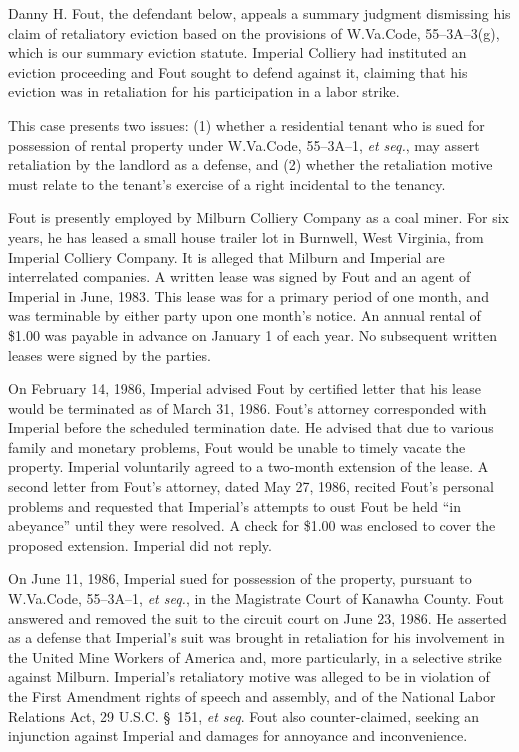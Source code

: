 
Danny H. Fout, the defendant below, appeals a summary judgment dismissing his
claim of retaliatory eviction based on the provisions of W.Va.Code,
55--3A--3(g), which is our summary eviction statute. Imperial Colliery had
instituted an eviction proceeding and Fout sought to defend against it,
claiming that his eviction was in retaliation for his participation in a labor
strike.

This case presents two issues: (1) whether a residential tenant who is sued for
possession of rental property under W.Va.Code, 55--3A--1, \textit{et seq.}, may
assert retaliation by the landlord as a defense, and (2) whether the
retaliation motive must relate to the tenant's exercise of a right incidental
to the tenancy.

Fout is presently employed by Milburn Colliery Company as a coal miner. For six
years, he has leased a small house trailer lot in Burnwell, West Virginia, from
Imperial Colliery Company. It is alleged that Milburn and Imperial are
interrelated companies. A written lease was signed by Fout and an agent of
Imperial in June, 1983. This lease was for a primary period of one month, and
was terminable by either party upon one month's notice. An annual rental of
\$1.00 was payable in advance on January 1 of each year. No subsequent written
leases were signed by the parties.

On February 14, 1986, Imperial advised Fout by certified letter that his lease
would be terminated as of March 31, 1986. Fout's attorney corresponded with
Imperial before the scheduled termination date. He advised that due to various
family and monetary problems, Fout would be unable to timely vacate the
property. Imperial voluntarily agreed to a two-month extension of the lease. A
second letter from Fout's attorney, dated May 27, 1986, recited Fout's personal
problems and requested that Imperial's attempts to oust Fout be held ``in
abeyance'' until they were resolved. A check for \$1.00 was enclosed to cover
the proposed extension. Imperial did not reply.

On June 11, 1986, Imperial sued for possession of the property, pursuant to
W.Va.Code, 55--3A--1, \textit{et seq.}, in the Magistrate Court of Kanawha
County. Fout answered and removed the suit to the circuit court on June 23,
1986. He asserted as a defense that Imperial's suit was brought in retaliation
for his involvement in the United Mine Workers of America and, more
particularly, in a selective strike against Milburn. Imperial's retaliatory
motive was alleged to be in violation of the First Amendment rights of speech
and assembly, and of the National Labor Relations Act, 29 U.S.C. \S~151,
\textit{et seq}. Fout also counter-claimed, seeking an injunction against
Imperial and damages for annoyance and inconvenience.

